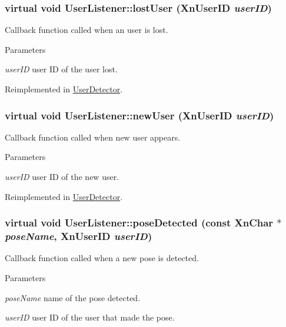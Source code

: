 \hypertarget{classUserListener_a399b56657670357e6545536732c38da2}{
\subsubsection[{lostUser}]{\setlength{\rightskip}{0pt plus 5cm}virtual void UserListener::lostUser (XnUserID {\em userID})}}
\label{classUserListener_a399b56657670357e6545536732c38da2}
Callback function called when an user is lost. 
\begin{DoxyParams}{Parameters}
\item[{\em userID}]user ID of the user lost. \end{DoxyParams}


Reimplemented in \hyperlink{classUserDetector_a486ca42bbdc01ef853c82b36cda7cc84}{UserDetector}.

\hypertarget{classUserListener_a4e7335d446ea94445305fb88b5612091}{
\subsubsection[{newUser}]{\setlength{\rightskip}{0pt plus 5cm}virtual void UserListener::newUser (XnUserID {\em userID})}}
\label{classUserListener_a4e7335d446ea94445305fb88b5612091}
Callback function called when new user appears. 
\begin{DoxyParams}{Parameters}
\item[{\em userID}]user ID of the new user. \end{DoxyParams}


Reimplemented in \hyperlink{classUserDetector_a42845024a854fd79a714c00cfd5fd59b}{UserDetector}.

\hypertarget{classUserListener_a52680abee2bb2da94e748b394a435edc}{
\subsubsection[{poseDetected}]{\setlength{\rightskip}{0pt plus 5cm}virtual void UserListener::poseDetected (const XnChar $\ast$ {\em poseName}, \/  XnUserID {\em userID})}}
\label{classUserListener_a52680abee2bb2da94e748b394a435edc}
Callback function called when a new pose is detected. 
\begin{DoxyParams}{Parameters}
\item[{\em poseName}]name of the pose detected. \item[{\em userID}]user ID of the user that made the pose. \end{DoxyParams}


